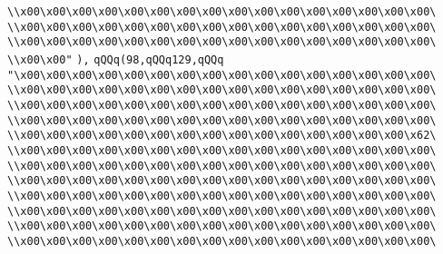 \verb|\\x00\x00\x00\x00\x00\x00\x00\x00\x00\x00\x00\x00\x00\x00\x00\x00\|\newline
\verb|\\x00\x00\x00\x00\x00\x00\x00\x00\x00\x00\x00\x00\x00\x00\x00\x00\|\newline
\verb|\\x00\x00\x00\x00\x00\x00\x00\x00\x00\x00\x00\x00\x00\x00\x00\x00\|\newline
\verb|\\x00\x00"|\newline
\verb|),|\newline
\verb|qQQq(98,qQQq129,qQQq|\newline
\verb|"\x00\x00\x00\x00\x00\x00\x00\x00\x00\x00\x00\x00\x00\x00\x00\x00\|\newline
\verb|\\x00\x00\x00\x00\x00\x00\x00\x00\x00\x00\x00\x00\x00\x00\x00\x00\|\newline
\verb|\\x00\x00\x00\x00\x00\x00\x00\x00\x00\x00\x00\x00\x00\x00\x00\x00\|\newline
\verb|\\x00\x00\x00\x00\x00\x00\x00\x00\x00\x00\x00\x00\x00\x00\x00\x00\|\newline
\verb|\\x00\x00\x00\x00\x00\x00\x00\x00\x00\x00\x00\x00\x00\x00\x00\x62\|\newline
\verb|\\x00\x00\x00\x00\x00\x00\x00\x00\x00\x00\x00\x00\x00\x00\x00\x00\|\newline
\verb|\\x00\x00\x00\x00\x00\x00\x00\x00\x00\x00\x00\x00\x00\x00\x00\x00\|\newline
\verb|\\x00\x00\x00\x00\x00\x00\x00\x00\x00\x00\x00\x00\x00\x00\x00\x00\|\newline
\verb|\\x00\x00\x00\x00\x00\x00\x00\x00\x00\x00\x00\x00\x00\x00\x00\x00\|\newline
\verb|\\x00\x00\x00\x00\x00\x00\x00\x00\x00\x00\x00\x00\x00\x00\x00\x00\|\newline
\verb|\\x00\x00\x00\x00\x00\x00\x00\x00\x00\x00\x00\x00\x00\x00\x00\x00\|\newline
\verb|\\x00\x00\x00\x00\x00\x00\x00\x00\x00\x00\x00\x00\x00\x00\x00\x00\|\newline
